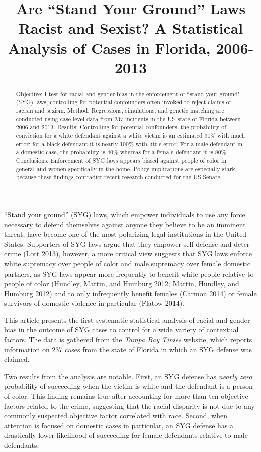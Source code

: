 \documentclass[12pt,article]{article}
\title{Are ``Stand Your Ground'' Laws Racist and Sexist? A Statistical Analysis
of Cases in Florida, 2006-2013}
\author{}
\date{}
\begin{document}
\maketitle


\begin{abstract}
Objective: I test for racial and gender bias in the enforcement of ``stand your ground" (SYG) laws, controlling for potential confounders often invoked to reject claims of racism and sexism. Method: Regressions, simulations, and genetic matching are conducted using case-level data from 237 incidents in the US state of Florida between 2006 and 2013. Results: Controlling for potential confounders, the probability of conviction for a white defendant against a white victim is an estimated 90\% with much error; for a black defendant it is nearly 100\% with little error. For a male defendant in a domestic case, the probability is 40\% whereas for a female defendant it is 80\%. Conclusions: Enforcement of SYG laws appears biased against people of color in general and women specifically in the home. Policy implications are especially stark because these findings contradict recent research conducted for the US Senate.\end{abstract}
\doublespacing

``Stand your ground'' (SYG) laws, which empower individuals to use any
force necessary to defend themselves against anyone they believe to be
an imminent threat, have become one of the most polarizing legal
institutions in the United States. Supporters of SYG laws argue that
they empower self-defense and deter crime (Lott 2013), however, a more
critical view suggests that SYG laws enforce white supremacy over people
of color and male supremacy over female domestic partners, as SYG laws
appear more frequently to benefit white people relative to people of
color (Hundley, Martin, and Humburg 2012; Martin, Hundley, and Humburg
2012) and to only infrequently benefit females (Carmon 2014) or female
survivors of domestic violence in particular (Flatow 2014).

\setlength\parindent{24pt}

This article presents the first systematic statistical analysis of
racial and gender bias in the outcome of SYG cases to control for a wide
variety of contextual factors. The data is gathered from the \emph{Tampa
Bay Times} website, which reports information on 237 cases from the
state of Florida in which an SYG defense was claimed.

Two results from the analysis are notable. First, an SYG defense has
\emph{nearly zero} probability of succeeding when the victim is white
and the defendant is a person of color. This finding remains true after
accounting for more than ten objective factors related to the crime,
suggesting that the racial disparity is not due to any commonly
suspected objective factor correlated with race. Second, when attention
is focused on domestic cases in particular, an SYG defense has a
drastically lower likelihood of succeeding for female defendants
relative to male defendants.
\end{document}
